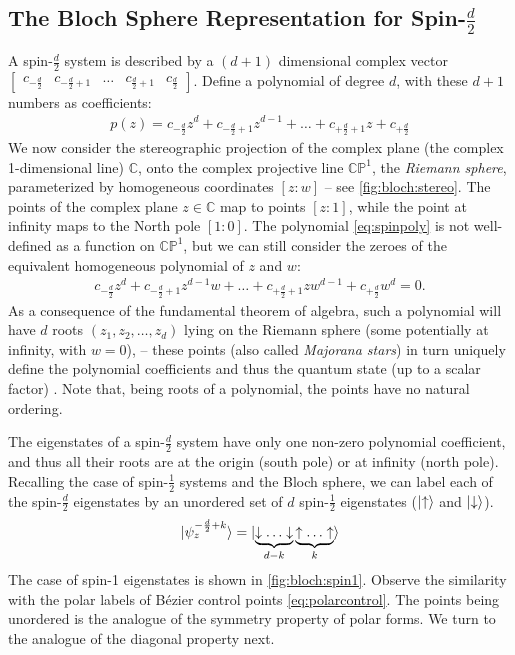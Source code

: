 \documentclass[12pt,final,3p]{elsarticle}
\begin{document}
\subsection{The Bloch Sphere Representation for Spin-$\frac{d}{2}$}\label{sec:spinfacts:majorana}
A spin-$\frac{d}{2}$ system is described by a $(d+1)$ dimensional complex vector 
$\begin{bmatrix}
	c_{-{\frac{d}{2}}} & c_{-{\frac{d}{2}} + 1} & \ldots & c_{{\frac{d}{2}} + 1} & c_{{\frac{d}{2}}}
\end{bmatrix}$. 
Define a polynomial of degree $d$, with these $d+1$ numbers as coefficients:
\begin{align}\label{eq:spinpoly}
p(z) = c_{-{\frac{d}{2}}}z^{d} + c_{-{\frac{d}{2}}+1}z^{d-1} + \ldots +  c_{+{\frac{d}{2}}+1}z + c_{+\frac{d}{2}}
\end{align}
We now consider the stereographic projection of the complex plane (the complex 1-dimensional line) $\mathbb{C}$, onto the complex projective line $\mathbb{CP}^{1}$, the \emph{Riemann sphere}, parameterized by homogeneous coordinates $[z:w]$ -- see \autoref{fig:bloch:stereo}. The points of the complex plane $z \in \mathbb{C}$ map to points $\left[z : 1 \right]$, while the point at infinity maps to the North pole $[1 : 0]$. The polynomial \eqref{eq:spinpoly} is not  well-defined as a function on $\mathbb{CP}^{1}$, but we can still consider the zeroes of the equivalent homogeneous polynomial of $z$ and $w$:
\begin{align}\label{eq:spinhompoly}
c_{-{\frac{d}{2}}}z^{d} + c_{-{\frac{d}{2}}+1}z^{d-1}w + \ldots +  c_{+{\frac{d}{2}}+1}zw^{d-1} + c_{+\frac{d}{2}}w^{d} = 0.
\end{align}
As a consequence of the fundamental theorem of algebra, such a polynomial will have $d$ roots $(z_{1}, z_{2}, \ldots, z_{d})$ lying on the Riemann sphere (some potentially at infinity, with $w = 0$), -- these points (also called \emph{Majorana stars}) in turn uniquely define the polynomial coefficients and thus the quantum state (up to a scalar factor) \cite[Ch. 22.10]{penrose2006road}. Note that, being roots of a polynomial, the points have no natural ordering.

The eigenstates of a spin-$\frac{d}{2}$ system have only one non-zero polynomial coefficient, and thus all their roots are at the origin (south pole) or at infinity (north pole). Recalling the case of spin-$\frac{1}{2}$ systems and the Bloch sphere, we can label each of the spin-$\frac{d}{2}$ eigenstates by an unordered set of $d$ spin-$\frac{1}{2}$ eigenstates ($\ket{\uparrow}$ and $\ket{\downarrow}$).
\begin{align}
\ket{\psi_{z}^{-\frac{d}{2} + k}}  = \ket{\underbrace{\downarrow \ldots \downarrow}_{d-k}\underbrace{\uparrow \ldots \uparrow}_{k}}
\end{align}
The case of spin-1 eigenstates is shown in \autoref{fig:bloch:spin1}. Observe the similarity with the polar labels of B\'{e}zier control points \eqref{eq:polarcontrol}. The points being unordered is the analogue of the symmetry property of polar forms. We turn to the analogue of the diagonal property next.
\end{document}
